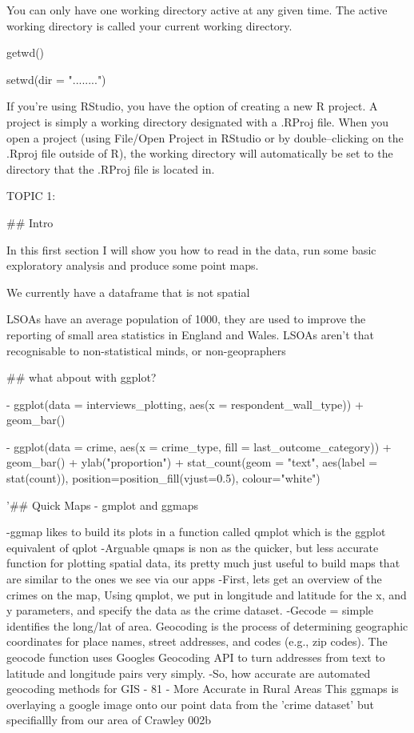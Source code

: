 \documentclass[12pt]{article}
\begin{document}
You can only have one working directory active at any given time. The active working directory is called your current working directory.

getwd()

setwd(dir = "........")

If you’re using RStudio, you have the option of creating a new R project. A project is simply a working directory designated with a .RProj file. When you open a project (using File/Open Project in RStudio or by double–clicking on the .Rproj file outside of R), the working directory will automatically be set to the directory that the .RProj file is located in.




TOPIC 1:

## Intro 

In this first section I will show you how to read in the data, run some basic exploratory analysis and produce some point maps. 

We currently have a dataframe that is not spatial

LSOAs have an average population of 1000, they are used to improve the reporting of small area statistics in England and Wales. 
LSOAs aren't that recognisable to non-statistical minds, or non-geopraphers 



## what abpout with ggplot?

- ggplot(data = interviews_plotting, aes(x = respondent_wall_type)) +
    geom_bar()

- ggplot(data = crime, aes(x = crime_type, fill = last_outcome_category)) +
    geom_bar() + ylab("proportion") +
    stat_count(geom = "text", 
             aes(label = stat(count)),
             position=position_fill(vjust=0.5), colour="white")



'## Quick Maps - gmplot and ggmaps

-ggmap likes to build its plots in a function called qmplot which is the ggplot equivalent of qplot
-Arguable qmaps is non as the quicker, but less accurate function for plotting spatial data, its pretty much just useful to build maps that are similar to the ones we see via our apps 
-First, lets get an overview of the crimes on the map, Using qmplot, we put in longitude and latitude for the x, and y parameters, and specify the data as the crime dataset.
-Gecode = simple identifies the long/lat of area. Geocoding is the process of determining geographic coordinates for place names, street addresses, and codes (e.g., zip codes).
The geocode function uses Googles Geocoding API to turn addresses from text to latitude and longitude pairs very simply.
-So, how accurate are automated geocoding methods for GIS
- 81%
- More Accurate in Rural Areas
This ggmaps is overlaying a google image onto our point data from the 'crime dataset' but specifiallly from our area of Crawley 002b
\end{document}

